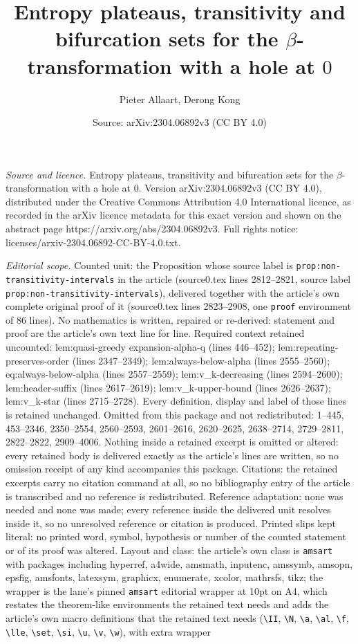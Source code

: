 \documentclass[10pt,a4paper]{amsart}
\title[Entropy plateaus, transitivity and bifurcation sets for the ]{Entropy plateaus, transitivity and bifurcation sets for the $\beta$-transformation with a hole at $0$}
\author{Pieter Allaart, Derong Kong}
\date{Source: arXiv:2304.06892v3 (CC BY 4.0)}
\begin{document}
\maketitle

\noindent\emph{Source and licence.} Entropy plateaus, transitivity and bifurcation sets for the $\beta$-transformation with a hole at $0$. Version arXiv:2304.06892v3 (CC BY 4.0), distributed under the Creative Commons Attribution 4.0 International licence, as recorded in the arXiv licence metadata for this exact version and shown on the abstract page https://arxiv.org/abs/2304.06892v3. Full rights notice: licenses/arxiv-2304.06892-CC-BY-4.0.txt.\par\smallskip

\noindent\textit{Editorial scope.} Counted unit: the Proposition whose source label is \texttt{prop:non-transitivity-intervals} in the article (source0.tex lines 2812--2821, source label \texttt{prop:non-transitivity-intervals}), delivered together with the article's own complete original proof of it (source0.tex lines 2823--2908, one \texttt{proof} environment of 86 lines). No mathematics is written, repaired or re-derived: statement and proof are the article's own text line for line. Required context retained uncounted: lem:quasi-greedy expansion-alpha-q (lines 446--452); lem:repeating-preserves-order (lines 2347--2349); lem:always-below-alpha (lines 2555--2560); eq:always-below-alpha (lines 2557--2559); lem:v\_k-decreasing (lines 2594--2600); lem:header-suffix (lines 2617--2619); lem:v\_k-upper-bound (lines 2626--2637); lem:v\_k-star (lines 2715--2728). Every definition, display and label of those lines is retained unchanged. Omitted from this package and not redistributed: 1--445, 453--2346, 2350--2554, 2560--2593, 2601--2616, 2620--2625, 2638--2714, 2729--2811, 2822--2822, 2909--4006. Nothing inside a retained excerpt is omitted or altered: every retained body is delivered exactly as the article's lines are written, so no omission receipt of any kind accompanies this package. Citations: the retained excerpts carry no citation command at all, so no bibliography entry of the article is transcribed and no reference is redistributed. Reference adaptation: none was needed and none was made; every reference inside the delivered unit resolves inside it, so no unresolved reference or citation is produced. Printed slips kept literal: no printed word, symbol, hypothesis or number of the counted statement or of its proof was altered. Layout and class: the article's own class is \texttt{amsart} with packages including hyperref, a4wide, amsmath, inputenc, amssymb, amsopn, epsfig, amsfonts, latexsym, graphicx, enumerate, xcolor, mathrsfs, tikz; the wrapper is the lane's pinned \texttt{amsart} editorial wrapper at 10pt on A4, which restates the theorem-like environments the retained text needs and adds the article's own macro definitions that the retained text needs (\texttt{\textbackslash II}, \texttt{\textbackslash N}, \texttt{\textbackslash a}, \texttt{\textbackslash al}, \texttt{\textbackslash f}, \texttt{\textbackslash lle}, \texttt{\textbackslash set}, \texttt{\textbackslash si}, \texttt{\textbackslash u}, \texttt{\textbackslash v}, \texttt{\textbackslash w}), with extra wrapper 
\end{document}
